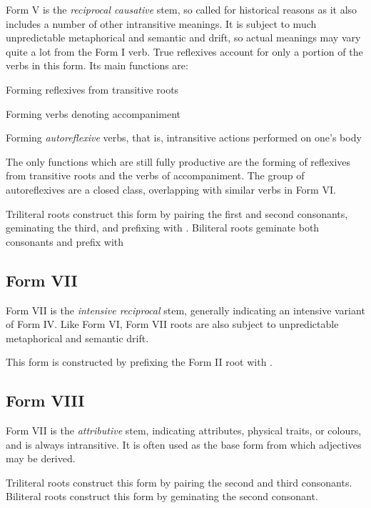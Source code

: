 \documentclass[grammar]{subfiles}
\begin{document}
  Form V is the \emph{reciprocal causative} stem, so called for historical reasons as it also includes a number of other intransitive meanings. 
  It is subject to much unpredictable metaphorical and semantic and drift, so actual meanings may vary quite a lot from the Form I verb.
  True reflexives account for only a portion of the verbs in this form. 
  Its main functions are: 

  \begin{itemize*}
    \item Forming reflexives from transitive roots
    \item Forming verbs denoting accompaniment
    \item Forming \emph{autoreflexive} verbs, that is, intransitive actions performed on one’s body
  \end{itemize*}

  The only functions which are still fully productive are the forming of reflexives from transitive roots and the verbs of accompaniment. 
  The group of autoreflexives are a closed class, overlapping with similar verbs in Form VI.

  Triliteral roots construct this form by pairing the first and second consonants, geminating the third, and prefixing with . 
  Biliteral roots geminate both consonants and prefix with 

  \subsection{Form VII}
  \label{ssec:dev_verb_form_vii}

  Form VII is the \emph{intensive reciprocal} stem, generally indicating an intensive variant of Form IV.
  Like Form VI, Form VII roots are also subject to unpredictable metaphorical and semantic drift.

  This form is constructed by prefixing the Form II root with .

  \subsection{Form VIII}
  \label{ssec:dev_verb_form_viii}

  Form VII is the \emph{attributive} stem, indicating attributes, physical traits, or colours, and is always intransitive. 
  It is often used as the base form from which adjectives may be derived.

  Triliteral roots construct this form by pairing the second and third consonants. 
  Biliteral roots construct this form by geminating the second consonant.
\end{document}
